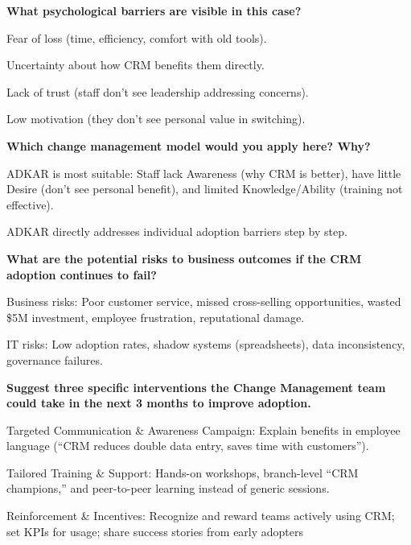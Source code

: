 \bigskip

\noindent\textbf{What psychological barriers are visible in this case?}



Fear of loss (time, efficiency, comfort with old tools).

Uncertainty about how CRM benefits them directly.

Lack of trust (staff don’t see leadership addressing concerns).

Low motivation (they don’t see personal value in switching).


\bigskip

\noindent\textbf{Which change management model would you apply here? Why?}



ADKAR is most suitable: Staff lack Awareness (why CRM is better), have little Desire (don’t see personal benefit), and limited Knowledge/Ability (training not effective).

ADKAR directly addresses individual adoption barriers step by step.


\bigskip

\noindent\textbf{What are the potential risks to business outcomes if the CRM adoption continues to fail?}



Business risks: Poor customer service, missed cross-selling opportunities, wasted \$5M investment, employee frustration, reputational damage.

IT risks: Low adoption rates, shadow systems (spreadsheets), data inconsistency, governance failures.


\bigskip

\noindent\textbf{Suggest three specific interventions the Change Management team could take in the next 3 months to improve adoption.}



Targeted Communication \& Awareness Campaign: Explain benefits in employee language (“CRM reduces double data entry, saves time with customers”).

Tailored Training \& Support: Hands-on workshops, branch-level “CRM champions,” and peer-to-peer learning instead of generic sessions.

Reinforcement \& Incentives: Recognize and reward teams actively using CRM; set KPIs for usage; share success stories from early adopters
